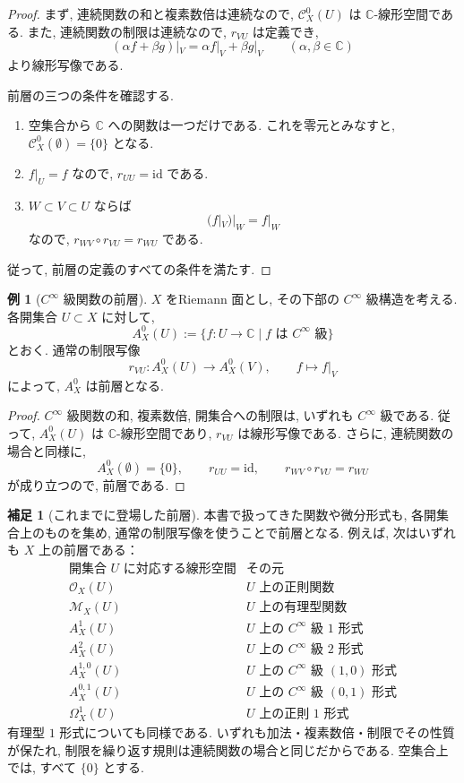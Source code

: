 \documentclass[dvipdfmx,a4paper,11pt]{article} %
\newcommand{\C}{\mathbb{C}}
\theoremstyle{definition}
\numberwithin{equation}{section}
\newtheorem{rem}[thm]{補足}
\newtheorem{exa}[thm]{例}
\begin{document}
\begin{proof}
まず, 連続関数の和と複素数倍は連続なので, 
$\mathcal C_X^0(U)$ は $\C$-線形空間である.
また, 連続関数の制限は連続なので, $r_{VU}$ は定義でき, 
\[
(\alpha f+\beta g)|_V
=\alpha f|_V+\beta g|_V
\qquad(\alpha,\beta\in\C)
\]
より線形写像である.

前層の三つの条件を確認する.
\begin{enumerate}
\item
空集合から $\C$ への関数は一つだけである.
これを零元とみなすと, 
$\mathcal C_X^0(\emptyset)=\{0\}$ となる.

\item
$f|_U=f$ なので, $r_{UU}=\mathrm{id}$ である.

\item
$W\subset V\subset U$ ならば
\[
(f|_V)|_W=f|_W
\]
なので, $r_{WV}\circ r_{VU}=r_{WU}$ である.
\end{enumerate}
従って, 前層の定義のすべての条件を満たす.
\end{proof}

\begin{exa}[$C^\infty$ 級関数の前層]
$X$ をRiemann 面とし, その下部の $C^\infty$ 級構造を考える.
各開集合 $U\subset X$ に対して, 
\[
A_X^0(U)
:=\{f:U\to\C\mid f\text{ は }C^\infty\text{ 級}\}
\]
とおく.
通常の制限写像
\[
r_{VU}:A_X^0(U)\longrightarrow A_X^0(V),
\qquad f\longmapsto f|_V
\]
によって, $A_X^0$ は前層となる.
\end{exa}

\begin{proof}
$C^\infty$ 級関数の和, 複素数倍, 開集合への制限は, 
いずれも $C^\infty$ 級である.
従って, $A_X^0(U)$ は $\C$-線形空間であり, 
$r_{VU}$ は線形写像である.
さらに, 連続関数の場合と同様に, 
\[
A_X^0(\emptyset)=\{0\},\qquad
r_{UU}=\mathrm{id},\qquad
r_{WV}\circ r_{VU}=r_{WU}
\]
が成り立つので, 前層である.
\end{proof}

\begin{rem}[これまでに登場した前層]\label{exa-holomorphic-presheaf}
本書で扱ってきた関数や微分形式も, 
各開集合上のものを集め, 通常の制限写像を使うことで前層となる.
例えば, 次はいずれも $X$ 上の前層である：
\[
\begin{array}{c|l}
\text{開集合 }U\text{ に対応する線形空間}
& \text{その元}\\ \hline
\mathcal O_X(U) & U\text{ 上の正則関数}\\
\mathcal M_X(U) & U\text{ 上の有理型関数}\\
A_X^1(U) & U\text{ 上の }C^\infty\text{ 級 }1\text{ 形式}\\
A_X^2(U) & U\text{ 上の }C^\infty\text{ 級 }2\text{ 形式}\\
A_X^{1,0}(U) & U\text{ 上の }C^\infty\text{ 級 }(1,0)\text{ 形式}\\
A_X^{0,1}(U) & U\text{ 上の }C^\infty\text{ 級 }(0,1)\text{ 形式}\\
\Omega_X^1(U) & U\text{ 上の正則 }1\text{ 形式}
\end{array}
\]
有理型 $1$ 形式についても同様である.
いずれも加法・複素数倍・制限でその性質が保たれ, 
制限を繰り返す規則は連続関数の場合と同じだからである.
空集合上では, すべて $\{0\}$ とする.
\end{rem}
\end{document}

